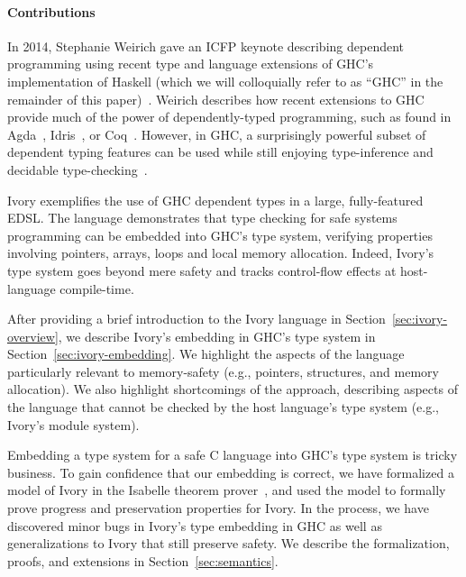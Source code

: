 
\paragraph{Contributions}
In 2014, Stephanie Weirich gave an ICFP keynote describing dependent programming
using recent type and language extensions of GHC's implementation of Haskell
(which we will colloquially refer to as ``GHC'' in the remainder of this
paper)~\cite{weirich-keynote}. Weirich describes how recent extensions to GHC
provide much of the power of dependently-typed programming, such as found in
Agda~\cite{agda}, Idris~\cite{idris}, or Coq~\cite{coq}. However, in GHC, a
surprisingly powerful subset of dependent typing features can be used while
still enjoying type-inference and decidable type-checking~\cite{dephaskell}.

Ivory exemplifies the use of GHC dependent types in a large, fully-featured
EDSL. The language demonstrates that type checking for safe systems programming
can be embedded into GHC's type system, verifying properties involving
pointers, arrays, loops and local memory allocation. Indeed, Ivory's type
system goes beyond mere safety and tracks control-flow effects at host-language
compile-time.

After providing a brief introduction to the Ivory language in
Section~\ref{sec:ivory-overview}, we describe Ivory's embedding in GHC's type
system in Section~\ref{sec:ivory-embedding}. We highlight the aspects of the
language particularly relevant to memory-safety (e.g., pointers, structures, and
memory allocation). We also highlight shortcomings of the approach, describing
aspects of the language that cannot be checked by the host language's type
system (e.g., Ivory's module system).

Embedding a type system for a safe C language into GHC's type system is tricky
business. To gain confidence that our embedding is correct, we have formalized a
model of Ivory in the Isabelle theorem prover~\cite{isabelle}, and used the model to
formally prove progress and preservation properties for Ivory. In the process,
we have discovered minor bugs in Ivory's type embedding in GHC as well as
generalizations to Ivory that still preserve safety. We describe the
formalization, proofs, and extensions in Section~\ref{sec:semantics}.

